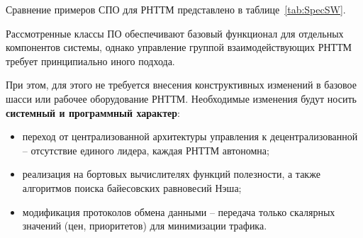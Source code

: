 Сравнение примеров СПО для РНТТМ представлено в таблице\ \cref{tab:SpecSW}.


\begin{table}[htbp]
	\centering
	\caption{Сравнение специализированного ПО РНТТМ}\label{tab:SpecSW}
\end{table}


Рассмотренные классы ПО обеспечивают базовый функционал для отдельных компонентов системы, однако управление группой взаимодействующих РНТТМ требует принципиально иного подхода.

При этом, для этого не требуется внесения конструктивных изменений в базовое шасси или рабочее оборудование РНТТМ. Необходимые изменения будут носить \textbf{системный и программный характер}:
\begin{itemize}[beginpenalty=10000, midpenalty=10000, wide=\parindent, leftmargin=0pt]
	\item переход от централизованной архитектуры управления к децентрализованной -- отсутствие единого лидера, каждая РНТТМ автономна;
	\item реализация на бортовых вычислителях функций полезности, а также алгоритмов поиска байесовских равновесий Нэша;
	\item модификация протоколов обмена данными -- передача только скалярных значений (цен, приоритетов) для минимизации трафика.
\end{itemize}

